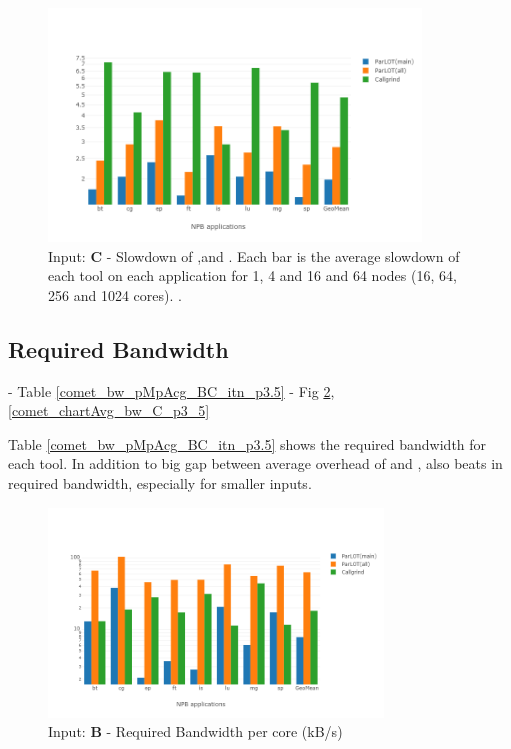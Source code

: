\begin{figure}[!t]
\centering
\includegraphics[width=3.9in]{figs.comet/comet_chartAvg_sd_C_p3_5.png}
\caption{ Input: \textbf{C} - Slowdown of \parlotm ,\parlota and \callgrind. Each bar is the average slowdown of each tool on each application for 1, 4 and 16 and 64 nodes (16, 64, 256 and 1024 cores). . 
}
\label{comet_chartAvg_sd_C_p3_5}
\end{figure}


 
 




  
\subsection{Required Bandwidth}
\label{subsec:lowbw}
 - Table \ref{comet_bw_pMpAcg_BC_itn_p3.5}
  - Fig \ref{comet_chartAvg_bw_B_p3_5}, \ref{comet_chartAvg_bw_C_p3_5}




Table \ref{comet_bw_pMpAcg_BC_itn_p3.5} shows the required bandwidth for each tool. 
In addition to big gap between average overhead of \parlotm and \callgrind, \parlotm also beats \callgrind in required bandwidth, especially for smaller inputs.

\begin{figure}[!t]
\centering
\includegraphics[width=3.5in]{figs.comet/comet_chartAvg_bw_B_p3_5.png}
\caption{ Input: \textbf{B} - Required Bandwidth per core (kB/s)
}
\label{comet_chartAvg_bw_B_p3_5}
\end{figure}


